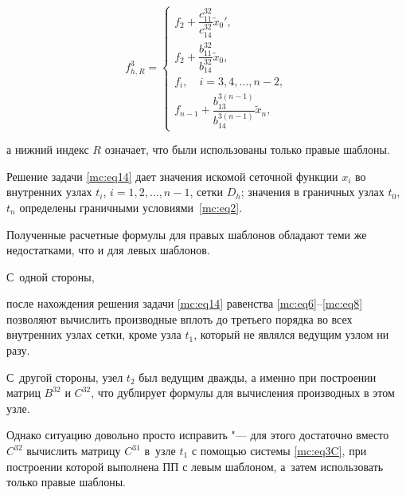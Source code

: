 \begin{equation}

\label{mc:eq16}

f_{h,R}^3=

\begin{cases}

f_{2}+\dfrac{c_{11}^{32}}{c_{14}^{32}} \widetilde{x}_0',

\\[3mm]

f_{2}+\dfrac{b_{11}^{32}}{b_{14}^{32}} \widetilde{x}_0,

\\[3mm]

f_{i},\quad  i=3,  4,  \dots,  n-2,

\\[1mm]

f_{n-1}+\dfrac{b_{13}^{3(n-1)}}{b_{14}^{3(n-1)}} \widetilde{x}_n,

\end{cases}

\end{equation}

а нижний индекс $R$ означает, что были использованы только правые шаблоны.



Решение задачи \eqref{mc:eq14} дает значения искомой сеточной функции $x_i$ во внутренних узлах $   t_i$, $   i=1,  2,  \dots,  n-1$, сетки $   D_h$; значения в граничных узлах  $   t_0$, $t_n$ определены граничными условиями~\eqref{mc:eq2}.







Полученные расчетные формулы для правых шаблонов обладают теми же недостатками, что и для левых шаблонов.

С~одной стороны,

после нахождения решения задачи \eqref{mc:eq14} равенства \eqref{mc:eq6}--\eqref{mc:eq8} позволяют вычислить производные вплоть до третьего порядка во всех внутренних узлах сетки, кроме узла $   t_{1}$, который не являлся ведущим узлом ни разу. 

С~другой стороны, узел $   t_2$ был ведущим дважды, а именно при построении матриц $  B^{32}$ и $  C^{32}$, что дублирует формулы для вычисления производных в этом узле. 

Однако ситуацию довольно просто исправить "--- для этого достаточно вместо $  C^{32}$ вычислить матрицу $  C^{31}$ в~узле $   t_{1}$ с помощью системы \eqref{mc:eq3C}, при построении которой выполнена ПП с левым шаблоном, а~затем использовать только правые шаблоны. 

